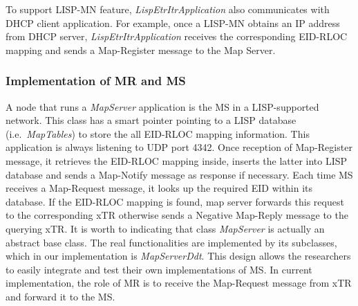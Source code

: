 To support LISP-MN feature, \emph{LispEtrItrApplication} also communicates with DHCP client application. For example, once a LISP-MN obtains an IP address from DHCP server, \emph{LispEtrItrApplication} receives the corresponding EID-RLOC mapping and sends a Map-Register message to the Map Server.

\subsubsection{Implementation of MR and MS}
A node that runs a \emph{MapServer} application is the MS in a LISP-supported network. This class has a smart pointer pointing to a LISP database (i.e.~\emph{MapTables}) to store the all EID-RLOC mapping information. This application is always listening to UDP port 4342. Once reception of Map-Register message, it retrieves the EID-RLOC mapping inside, inserts the latter into LISP database and sends a Map-Notify message as response if necessary. Each time MS receives a Map-Request message, it looks up the required EID within its database. If the EID-RLOC mapping is found, map server forwards this request to the corresponding xTR otherwise sends a Negative Map-Reply message to the querying xTR. It is worth to indicating that class \emph{MapServer} is actually an abstract base class. The real functionalities are implemented by its subclasses, which in our implementation is \emph{MapServerDdt}. This design allows the researchers to easily integrate and test their own implementations of MS. In current implementation, the role of MR is to receive the Map-Request message from xTR and forward it to the MS.

